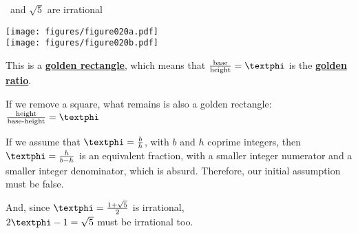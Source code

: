 \documentclass[14pt]{beamer}
\begin{document}

    \begin{frame}{\textphi\ and $\sqrt{5}$ are irrational}
        \begin{center}
            \begin{minipage}{0.45\textwidth}%
                \texttt{[image: figures/figure020a.pdf]} \\[2ex]
                \texttt{[image: figures/figure020b.pdf]} \\
            \end{minipage}\hfill\begin{minipage}{0.5\textwidth}
                \footnotesize
                This is a \textbf{\href{https://en.wikipedia.org/wiki/Golden_rectangle}{golden rectangle}}, which means that $\tfrac{\text{base}}{\text{height}} = \text{\textphi}$ is the \textbf{\href{https://en.wikipedia.org/wiki/Golden_ratio}{golden ratio}}.\bigskip

                If we remove a square, what remains is also a golden rectangle: $\tfrac{\text{height}}{\text{base-height}} = \text{\textphi}$\bigskip

                If we assume that $\text{\textphi} = \tfrac{b}{h}$, with $b$ and $h$ coprime integers, then $\text{\textphi} = \tfrac{h}{b-h}$ is an equivalent fraction, with a smaller integer numerator and a smaller integer denominator, which is absurd. Therefore, our initial assumption must be false.\bigskip

                And, since $\text{\textphi} =\tfrac{1+\sqrt{5}}{2}$ is irrational,\\[0.25ex]$2\text{\textphi} - 1 = \sqrt{5}$ must be irrational too.
            \end{minipage}
        \end{center}
    \end{frame}

\end{document}
